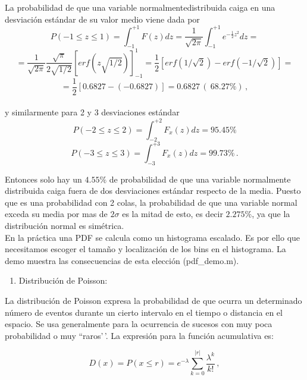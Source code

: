 \documentclass[
]{agujournal2019}
\providecommand{\tightlist}{%
  \setlength{\itemsep}{0pt}\setlength{\parskip}{0pt}}\usepackage{longtable,booktabs,array}
\begin{document}
La probabilidad de que una variable normalmentedistribuida caiga en una
desviación estándar de su valor medio viene dada por
\[P(-1\le z \le 1)=\int^{+1}_{-1} F(z) dz=\frac{1}{\sqrt{2\pi}}\int^{+1}_{-1}e^{-\frac{1}{2}z^2}dz=\]
\[=\frac{1}{\sqrt{2\pi}}\frac{\sqrt{\pi}}{2\sqrt{1/2}}\left[{ erf}({z\sqrt{1/2}})\right]^1_{-1}=
   \frac{1}{2}\left[{ erf}({1/\sqrt{2}})-{ erf}({-1/\sqrt{2}}) \right]=\]
\[=\frac{1}{2}\left[0.6827-(-0.6827)\right]=0.6827\,(~68.27\%)\,,\]\\

y similarmente para 2 y 3 desviaciones estándar\\

\[P(-2\le z \le 2)=\int^{+2}_{-2} F_x(z) dz=95.45\%\]
\[P(-3\le z \le 3)=\int^{+3}_{-3} F_x(z) dz=99.73\%\,.\]

Entonces solo hay un \(4.55\%\) de probabilidad de que una variable
normalmente distribuida caiga fuera de dos desviaciones estándar
respecto de la media. Puesto que es una probabilidad con 2 colas, la
probabilidad de que una variable normal exceda su media por mas de
\(2\sigma\) es la mitad de esto, es decir \(2.275\%\), ya que la
distribución normal es simétrica.\\
En la práctica una PDF se calcula como un histograma escalado. Es por
ello que necesitamos escoger el tamaño y localización de los bins en el
histograma. La demo muestra las consecuencias de esta elección
(pdf\_demo.m).

\begin{center}
\end{center}

\vspace{0.5cm}

\begin{enumerate}
\def\labelenumi{\arabic{enumi}.}
\setcounter{enumi}{2}
\tightlist
\item
  Distribución de Poisson:\\
\end{enumerate}

La distribución de Poisson expresa la probabilidad de que ocurra un
determinado número de eventos durante un cierto intervalo en el tiempo o
distancia en el espacio. Se usa generalmente para la ocurrencia de
sucesos con muy poca probabilidad o muy ``raros'\,'. La expresión para
la función acumulativa es:

\[D(x)=P(x \le r)=e^{-\lambda}\sum^{|r|}_{k=0}\frac{\lambda^k}{k!}\,,\]
\end{document}

